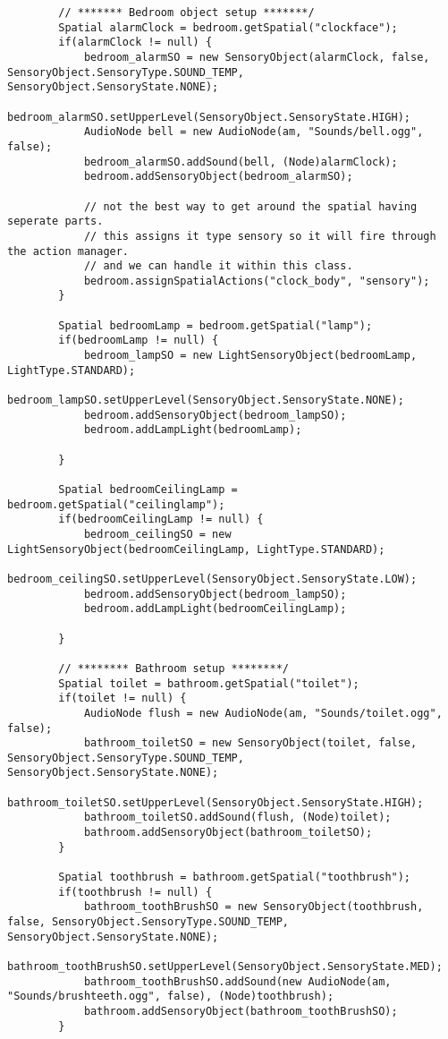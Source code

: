 \begin{lstlisting}
        // ******* Bedroom object setup *******/
        Spatial alarmClock = bedroom.getSpatial("clockface");
        if(alarmClock != null) {
            bedroom_alarmSO = new SensoryObject(alarmClock, false, SensoryObject.SensoryType.SOUND_TEMP, SensoryObject.SensoryState.NONE);
            bedroom_alarmSO.setUpperLevel(SensoryObject.SensoryState.HIGH);
            AudioNode bell = new AudioNode(am, "Sounds/bell.ogg", false);
            bedroom_alarmSO.addSound(bell, (Node)alarmClock);
            bedroom.addSensoryObject(bedroom_alarmSO);
            
            // not the best way to get around the spatial having seperate parts.
            // this assigns it type sensory so it will fire through the action manager.
            // and we can handle it within this class.
            bedroom.assignSpatialActions("clock_body", "sensory");
        }
        
        Spatial bedroomLamp = bedroom.getSpatial("lamp");
        if(bedroomLamp != null) {     
            bedroom_lampSO = new LightSensoryObject(bedroomLamp, LightType.STANDARD);
            bedroom_lampSO.setUpperLevel(SensoryObject.SensoryState.NONE);
            bedroom.addSensoryObject(bedroom_lampSO);
            bedroom.addLampLight(bedroomLamp);
            
        }    
        
        Spatial bedroomCeilingLamp = bedroom.getSpatial("ceilinglamp");
        if(bedroomCeilingLamp != null) {
            bedroom_ceilingSO = new LightSensoryObject(bedroomCeilingLamp, LightType.STANDARD);
            bedroom_ceilingSO.setUpperLevel(SensoryObject.SensoryState.LOW);
            bedroom.addSensoryObject(bedroom_lampSO);
            bedroom.addLampLight(bedroomCeilingLamp);
            
        }
        
        // ******** Bathroom setup ********/
        Spatial toilet = bathroom.getSpatial("toilet");
        if(toilet != null) {
            AudioNode flush = new AudioNode(am, "Sounds/toilet.ogg", false);
            bathroom_toiletSO = new SensoryObject(toilet, false, SensoryObject.SensoryType.SOUND_TEMP, SensoryObject.SensoryState.NONE);
            bathroom_toiletSO.setUpperLevel(SensoryObject.SensoryState.HIGH);
            bathroom_toiletSO.addSound(flush, (Node)toilet);
            bathroom.addSensoryObject(bathroom_toiletSO);
        }
        
        Spatial toothbrush = bathroom.getSpatial("toothbrush");
        if(toothbrush != null) {
            bathroom_toothBrushSO = new SensoryObject(toothbrush, false, SensoryObject.SensoryType.SOUND_TEMP, SensoryObject.SensoryState.NONE);
            bathroom_toothBrushSO.setUpperLevel(SensoryObject.SensoryState.MED);
            bathroom_toothBrushSO.addSound(new AudioNode(am, "Sounds/brushteeth.ogg", false), (Node)toothbrush);
            bathroom.addSensoryObject(bathroom_toothBrushSO);
        }
        

\end{lstlisting}
